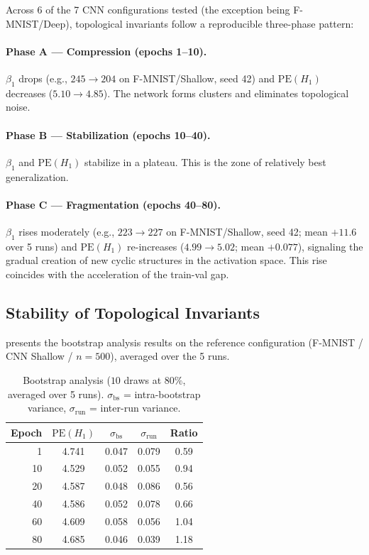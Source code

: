 \documentclass[11pt,a4paper]{article}
\newcommand{\betti}{\beta}
\newcommand{\PE}{\mathrm{PE}}
\begin{document}
Across 6 of the 7 CNN configurations tested (the exception being F-MNIST/Deep),
topological invariants follow a reproducible three-phase pattern:

\paragraph{Phase A --- Compression (epochs 1--10).}
$\betti_1$ drops (e.g., $245 \to 204$ on F-MNIST/Shallow, seed 42) and
$\PE(H_1)$ decreases ($5.10 \to 4.85$). The network forms clusters and
eliminates topological noise.

\paragraph{Phase B --- Stabilization (epochs 10--40).}
$\betti_1$ and $\PE(H_1)$ stabilize in a plateau. This is the zone of
relatively best generalization.

\paragraph{Phase C --- Fragmentation (epochs 40--80).}
$\betti_1$ rises moderately (e.g., $223 \to 227$ on F-MNIST/Shallow, seed 42;
mean $+11.6$ over 5 runs) and $\PE(H_1)$ re-increases ($4.99 \to 5.02$;
mean $+0.077$), signaling the gradual creation of new cyclic structures in
the activation space. This rise coincides with the acceleration of the
train-val gap.

\subsection{Stability of Topological Invariants}
\label{subsec:stabilite}

 presents the bootstrap analysis results on the
reference configuration (F-MNIST / CNN Shallow / $n = 500$), averaged
over the 5 runs.

\begin{table}[H]
  \centering
  \caption{Bootstrap analysis ($10$ draws at $80\%$, averaged over 5
  runs). $\sigma_{\mathrm{bs}}$ = intra-bootstrap variance,
  $\sigma_{\mathrm{run}}$ = inter-run variance.}
  \label{tab:bootstrap}
  \begin{tabular}{@{}rcccc@{}}
    \toprule
    Epoch & $\PE(H_1)$ & $\sigma_{\mathrm{bs}}$ &
    $\sigma_{\mathrm{run}}$ & Ratio \\
    \midrule
    1  & 4.741 & 0.047 & 0.079 & 0.59 \\
    10 & 4.529 & 0.052 & 0.055 & 0.94 \\
    20 & 4.587 & 0.048 & 0.086 & 0.56 \\
    40 & 4.586 & 0.052 & 0.078 & 0.66 \\
    60 & 4.609 & 0.058 & 0.056 & 1.04 \\
    80 & 4.685 & 0.046 & 0.039 & 1.18 \\
    \bottomrule
  \end{tabular}
\end{table}
\end{document}
